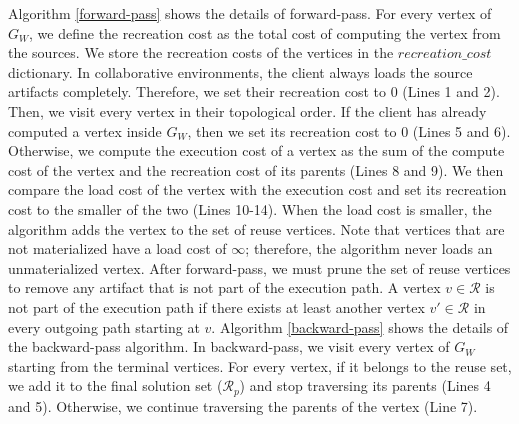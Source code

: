 Algorithm \ref{forward-pass} shows the details of forward-pass.
For every vertex of $G_W$, we define the recreation cost as the total cost of computing the vertex from the sources.
We store the recreation costs of the vertices in the $recreation\_cost$ dictionary.
In collaborative environments, the client always loads the source artifacts completely.
Therefore, we set their recreation cost to 0 (Lines 1 and 2).
Then, we visit every vertex in their topological order.
If the client has already computed a vertex inside $G_W$, then we set its recreation cost to 0 (Lines 5 and 6).
Otherwise, we compute the execution cost of a vertex as the sum of the compute cost of the vertex and the recreation cost of its parents (Lines 8 and 9).
We then compare the load cost of the vertex with the execution cost and set its recreation cost to the smaller of the two (Lines 10-14).
When the load cost is smaller, the algorithm adds the vertex to the set of reuse vertices.
Note that vertices that are not materialized have a load cost of $\infty$; therefore, the algorithm never loads an unmaterialized vertex.
After forward-pass, we must prune the set of reuse vertices to remove any artifact that is not part of the execution path.
A vertex $v \in \mathcal{R}$ is not part of the execution path if there exists at least another vertex $v' \in \mathcal{R}$ in every outgoing path starting at $v$.
Algorithm \ref{backward-pass} shows the details of the backward-pass algorithm.
In backward-pass, we visit every vertex of $G_W$ starting from the terminal vertices.
For every vertex, if it belongs to the reuse set, we add it to the final solution set ($\mathcal{R}_p$) and stop traversing its parents (Lines 4 and 5).
Otherwise, we continue traversing the parents of the vertex (Line 7).
